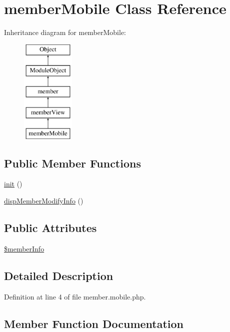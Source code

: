 \hypertarget{classmemberMobile}{}\section{member\+Mobile Class Reference}
\label{classmemberMobile}
Inheritance diagram for member\+Mobile\+:\begin{figure}[H]
\begin{center}
\leavevmode
\includegraphics[height=5.000000cm]{classmemberMobile}
\end{center}
\end{figure}
\subsection*{Public Member Functions}
\begin{DoxyCompactItemize}
\item 
\hyperlink{classmemberMobile_acfeb0d8e754d78d1885a27c4149f2332}{init} ()
\item 
\hyperlink{classmemberMobile_a5ff2cdfb96b24fbb892ab570f37067ed}{disp\+Member\+Modify\+Info} ()
\end{DoxyCompactItemize}
\subsection*{Public Attributes}
\begin{DoxyCompactItemize}
\item 
\hyperlink{classmemberMobile_af133603a9a49fa38538397499d14abbc}{\$member\+Info}
\end{DoxyCompactItemize}


\subsection{Detailed Description}


Definition at line 4 of file member.\+mobile.\+php.



\subsection{Member Function Documentation}
\mbox{\label{classmemberMobile_a5ff2cdfb96b24fbb892ab570f37067ed}} 

